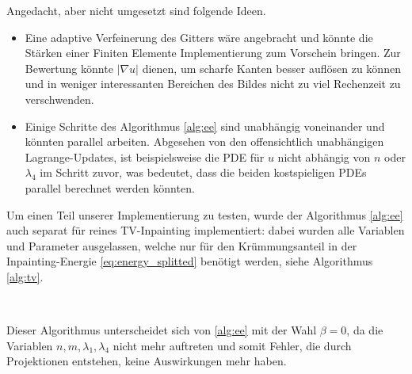 \documentclass{mythesis}
\begin{document}
Angedacht, aber nicht umgesetzt sind folgende Ideen.
\begin{itemize}
    \item
	Eine adaptive Verfeinerung des Gitters wäre angebracht und könnte die Stärken einer Finiten Elemente Implementierung zum Vorschein bringen.
	Zur Bewertung könnte $|\nabla u|$ dienen, um scharfe Kanten besser auflösen zu können und in weniger interessanten Bereichen des Bildes nicht zu viel Rechenzeit zu verschwenden.
    \item
	Einige Schritte des Algorithmus \ref{alg:ee} sind unabhängig voneinander und könnten parallel arbeiten.
	Abgesehen von den offensichtlich unabhängigen Lagrange-Updates, ist beispielsweise die PDE für $u$ nicht abhängig von $n$ oder $\lambda_4$ im Schritt zuvor, was bedeutet, dass die beiden kostspieligen PDEs parallel berechnet werden könnten.
\end{itemize}

Um einen Teil unserer Implementierung zu testen, wurde der Algorithmus \ref{alg:ee} auch separat für reines TV-Inpainting implementiert: dabei wurden alle Variablen und Parameter ausgelassen, welche nur für den Krümmungsanteil in der Inpainting-Energie \eqref{eq:energy_splitted} benötigt werden, siehe Algorithmus \ref{alg:tv}.

\begin{algorithm}[TV Inpainting] \label{alg:tv}
     \\
    \begin{algorithmic}
	\EndFor
    \end{algorithmic}
    \begin{note}
	Dieser Algorithmus unterscheidet sich von \ref{alg:ee} mit der Wahl $\beta = 0$, da die Variablen $n, m, \lambda_1, \lambda_4$ nicht mehr auftreten und somit Fehler, die durch Projektionen entstehen, keine Auswirkungen mehr haben.
    \end{note}
\end{algorithm}
\end{document}
